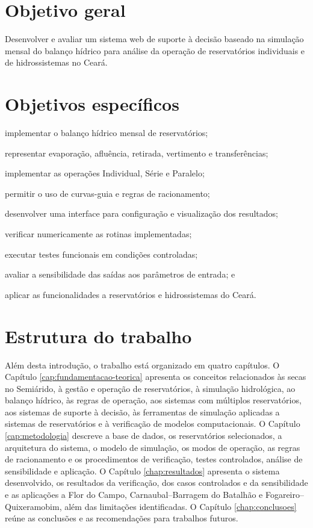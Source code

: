 \section{Objetivo geral}
\label{sec:objetivo-geral}

Desenvolver e avaliar um sistema web de suporte à decisão baseado na simulação mensal do balanço hídrico para análise da operação de reservatórios individuais e de hidrossistemas no Ceará.

\section{Objetivos específicos}
\label{sec:objetivos-especificos}

\begin{alineas}
    \item implementar o balanço hídrico mensal de reservatórios;
    \item representar evaporação, afluência, retirada, vertimento e transferências;
    \item implementar as operações Individual, Série e Paralelo;
    \item permitir o uso de curvas-guia e regras de racionamento;
    \item desenvolver uma interface para configuração e visualização dos resultados;
    \item verificar numericamente as rotinas implementadas;
    \item executar testes funcionais em condições controladas;
    \item avaliar a sensibilidade das saídas aos parâmetros de entrada; e
    \item aplicar as funcionalidades a reservatórios e hidrossistemas do Ceará.
\end{alineas}

\section{Estrutura do trabalho}
\label{sec:estrutura-trabalho}

Além desta introdução, o trabalho está organizado em quatro capítulos. O Capítulo \ref{cap:fundamentacao-teorica} apresenta os conceitos relacionados às secas no Semiárido, à gestão e operação de reservatórios, à simulação hidrológica, ao balanço hídrico, às regras de operação, aos sistemas com múltiplos reservatórios, aos sistemas de suporte à decisão, às ferramentas de simulação aplicadas a sistemas de reservatórios e à verificação de modelos computacionais. O Capítulo \ref{cap:metodologia} descreve a base de dados, os reservatórios selecionados, a arquitetura do sistema, o modelo de simulação, os modos de operação, as regras de racionamento e os procedimentos de verificação, testes controlados, análise de sensibilidade e aplicação. O Capítulo \ref{chap:resultados} apresenta o sistema desenvolvido, os resultados da verificação, dos casos controlados e da sensibilidade e as aplicações a Flor do Campo, Carnaubal--Barragem do Batalhão e Fogareiro--Quixeramobim, além das limitações identificadas. O Capítulo \ref{chap:conclusoes} reúne as conclusões e as recomendações para trabalhos futuros.
